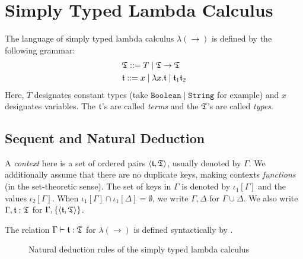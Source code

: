 \section{Simply Typed Lambda Calculus}

The language of simply typed lambda calculus $\lambda(\rightarrow)$ is defined by the following grammar:
\begin{align*}
    &\mathfrak{T} ::= T \mid \mathfrak{T} \rightarrow \mathfrak{T} \\
    &\mathfrak{t} ::= x \mid \lambda x. \mathfrak{t} \mid \mathfrak{t}_1 \mathfrak{t}_2
\end{align*}
Here, $T$ designates constant types (take $\mathtt{Boolean} \mid \mathtt{String}$ for example) and $x$ designates variables. The $\mathfrak{t}$'s are called \textit{terms} and the $\mathfrak{T}$'s are called \textit{types}.

\subsection{Sequent and Natural Deduction}

A \textit{context} here is a set of ordered pairs $\left\langle \mathfrak{t}, \mathfrak{T} \right\rangle$, usually denoted by $\Gamma$. We additionally assume that there are no duplicate keys, making contexts \textit{functions} (in the set-theoretic sense). The set of keys in $\Gamma$ is denoted by $\iota_1[\Gamma]$ and the values $\iota_2[\Gamma]$. When $\iota_1[\Gamma] \cap \iota_1[\Delta] = \emptyset$, we write $\Gamma, \Delta$ for $\Gamma \cup \Delta$. We also write $\Gamma, \mathfrak{t}: \mathfrak{T}$ for $\Gamma, \{\left\langle \mathfrak{t}, \mathfrak{T} \right\rangle\}$.

\begin{definition}
The relation $\Gamma \vdash \mathfrak{t} : \mathfrak{T}$ for $\lambda(\rightarrow)$ is defined syntactically by .
\end{definition}

\begin{figure}
    \centering
    
    \caption{Natural deduction rules of the simply typed lambda calculus}
    \label{fig:simply-typed-lambda-calculus-natural-deduction}
\end{figure}